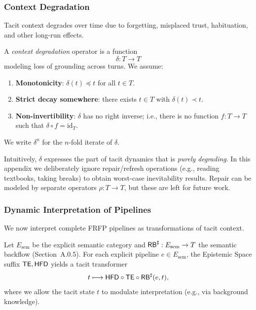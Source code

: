 \subsubsection{Context Degradation}

Tacit context degrades over time due to forgetting, misplaced trust,
habituation, and other long-run effects.

\begin{definition}
A \emph{context degradation} operator is a function
\[
\delta : T \to T
\]
modeling loss of grounding across turns. We assume:
\begin{enumerate}
  \item \textbf{Monotonicity}:
        \(\delta(t) \preceq t\) for all \(t \in T\).
  \item \textbf{Strict decay somewhere}:
        there exists \(t \in T\) with \(\delta(t) \prec t\).
  \item \textbf{Non-invertibility}:
        \(\delta\) has no right inverse; i.e., there is no function
        \(f:T\to T\) such that \(\delta \circ f = \mathrm{id}_T\).
\end{enumerate}
We write \(\delta^n\) for the \(n\)-fold iterate of \(\delta\).
\end{definition}

Intuitively, \(\delta\) expresses the part of tacit dynamics that is
\emph{purely degrading}. In this appendix we deliberately ignore
repair/refresh operations (e.g., reading textbooks, taking breaks) to
obtain worst-case inevitability results. Repair can be modeled by
separate operators \(\rho:T\to T\), but these are left for future work.

\subsubsection{Dynamic Interpretation of Pipelines}

We now interpret complete FRFP pipelines as transformations of tacit
context.

Let \(E_{\mathrm{sem}}\) be the explicit semantic category and \(\mathsf{RB}^\sharp : E_{\mathrm{sem}}\to T\) the semantic
backflow (Section~A.0.5). For each explicit pipeline \(e\in
E_{\mathrm{sem}}\), the Epistemic Space suffix \(\mathsf{TE},\mathsf{HFD}\) yields a tacit
transformer
\[
t \longmapsto \mathsf{HFD} \circ \mathsf{TE} \circ \mathsf{RB}^\sharp(e,t),
\]
where we allow the tacit state \(t\) to modulate interpretation
(e.g., via background knowledge).

